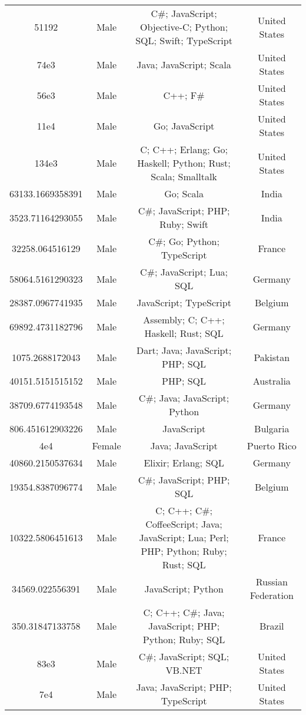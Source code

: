 \begin{center}
\begin{tabular}{ |c|c|c|c| }
51192  &  Male  &  C\#; JavaScript; Objective-C; Python; SQL; Swift; TypeScript  &  United States  \\ 
74e3  &  Male  &  Java; JavaScript; Scala  &  United States  \\ 
56e3  &  Male  &  C++; F\#  &  United States  \\ 
11e4  &  Male  &  Go; JavaScript  &  United States  \\ 
134e3  &  Male  &  C; C++; Erlang; Go; Haskell; Python; Rust; Scala; Smalltalk  &  United States  \\ 
63133.1669358391  &  Male  &  Go; Scala  &  India  \\ 
3523.71164293055  &  Male  &  C\#; JavaScript; PHP; Ruby; Swift  &  India  \\ 
32258.064516129  &  Male  &  C\#; Go; Python; TypeScript  &  France  \\ 
58064.5161290323  &  Male  &  C\#; JavaScript; Lua; SQL  &  Germany  \\ 
28387.0967741935  &  Male  &  JavaScript; TypeScript  &  Belgium  \\ 
69892.4731182796  &  Male  &  Assembly; C; C++; Haskell; Rust; SQL  &  Germany  \\ 
1075.2688172043  &  Male  &  Dart; Java; JavaScript; PHP; SQL  &  Pakistan  \\ 
40151.5151515152  &  Male  &  PHP; SQL  &  Australia  \\ 
38709.6774193548  &  Male  &  C\#; Java; JavaScript; Python  &  Germany  \\ 
806.451612903226  &  Male  &  JavaScript  &  Bulgaria  \\ 
4e4  &  Female  &  Java; JavaScript  &  Puerto Rico  \\ 
40860.2150537634  &  Male  &  Elixir; Erlang; SQL  &  Germany  \\ 
19354.8387096774  &  Male  &  C\#; JavaScript; PHP; SQL  &  Belgium  \\ 
10322.5806451613  &  Male  &  C; C++; C\#; CoffeeScript; Java; JavaScript; Lua; Perl; PHP; Python; Ruby; Rust; SQL  &  France  \\ 
34569.022556391  &  Male  &  JavaScript; Python  &  Russian Federation  \\ 
350.31847133758  &  Male  &  C; C++; C\#; Java; JavaScript; PHP; Python; Ruby; SQL  &  Brazil  \\ 
83e3  &  Male  &  C\#; JavaScript; SQL; VB.NET  &  United States  \\ 
7e4  &  Male  &  Java; JavaScript; PHP; TypeScript  &  United States  \\ 

\end{tabular}
\end{center}
